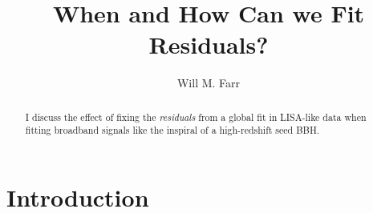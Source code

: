 \documentclass[modern]{aastex631}
\begin{document}
\title{When and How Can we Fit Residuals?}

\author[0000-0003-1540-8562]{Will M. Farr}

\begin{abstract}
    I discuss the effect of fixing the \emph{residuals} from a global fit in
    LISA-like data when fitting broadband signals like the inspiral of a
    high-redshift seed BBH.
\end{abstract}

\section{Introduction}
\end{document}
